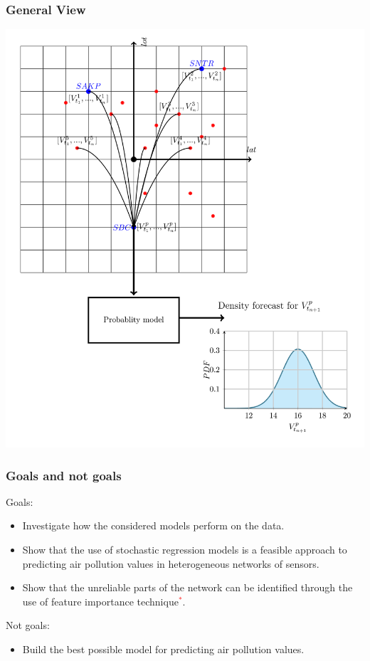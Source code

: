 \documentclass[18pt]{beamer}
\begin{document}
\begin{frame}
  \frametitle{General View}
  \vspace{-0.2in}
  \begin{center}
    \includegraphics[scale=0.10]{images/general_system}
  \end{center}
\end{frame}

\begin{frame}
  \frametitle{Goals and not goals}
  Goals:
  \begin{itemize}
  \item Investigate how the considered models perform on the data.
  \item Show that the use of stochastic regression models is a feasible approach to predicting air pollution values in heterogeneous networks of sensors.
  \item Show that the unreliable parts of the network can be identified through the use of feature importance technique\textcolor{red}{$^*$}.
  \end{itemize}
  Not goals:
  \begin{itemize}
  \item Build the best possible model for predicting air pollution values.
  \end{itemize}
\end{frame}
\end{document}
